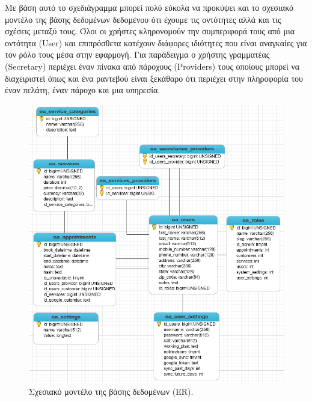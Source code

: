 Με βάση αυτό το σχεδιάγραμμα μπορεί πολύ εύκολα να προκύψει και το σχεσιακό μοντέλο της βάσης δεδομένων δεδομένου ότι έχουμε τις οντότητες αλλά και τις σχέσεις μεταξύ τους. Όλοι οι χρήστες κληρονομούν την συμπεριφορά τους από μια οντότητα (User) και επιπρόσθετα κατέχουν διάφορες ιδιότητες που είναι αναγκαίες για τον ρόλο τους μέσα στην εφαρμογή. Για παράδειγμα ο χρήστης γραμματέας (Secretary) περιέχει έναν πίνακα από πάροχους (Providers) τους οποίους μπορεί να διαχειριστεί όπως και ένα ραντεβού είναι ξεκάθαρο ότι περιέχει στην πληροφορία του έναν πελάτη, έναν πάροχο και μια υπηρεσία.

\begin{figure}[ht!]
\centering
\includegraphics[width=160mm]{images/er.png}
\caption{Σχεσιακό μοντέλο της βάσης δεδομένων (ER).}
\label{er}
\end{figure}

